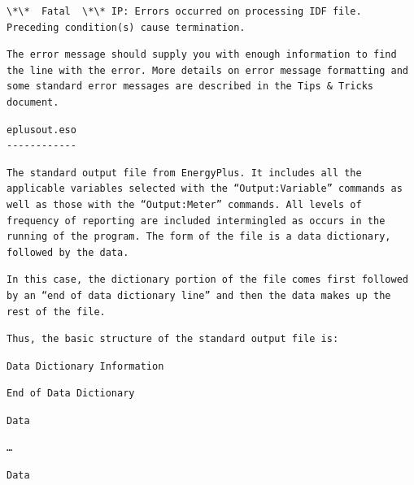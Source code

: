 \begin{lstlisting}
\*\*  Fatal  \*\* IP: Errors occurred on processing IDF file. Preceding condition(s) cause termination.
\end{lstlisting}

\begin{lstlisting}
The error message should supply you with enough information to find the line with the error. More details on error message formatting and some standard error messages are described in the Tips & Tricks document.
\end{lstlisting}

\begin{lstlisting}
eplusout.eso
------------
\end{lstlisting}

\begin{lstlisting}
The standard output file from EnergyPlus. It includes all the applicable variables selected with the “Output:Variable” commands as well as those with the “Output:Meter” commands. All levels of frequency of reporting are included intermingled as occurs in the running of the program. The form of the file is a data dictionary, followed by the data.
\end{lstlisting}

\begin{lstlisting}
In this case, the dictionary portion of the file comes first followed by an “end of data dictionary line” and then the data makes up the rest of the file.
\end{lstlisting}

\begin{lstlisting}
Thus, the basic structure of the standard output file is:
\end{lstlisting}

\begin{lstlisting}
Data Dictionary Information
\end{lstlisting}

\begin{lstlisting}
End of Data Dictionary
\end{lstlisting}

\begin{lstlisting}
Data
\end{lstlisting}

\begin{lstlisting}
…
\end{lstlisting}

\begin{lstlisting}
Data
\end{lstlisting}

